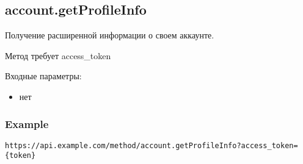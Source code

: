 \subsection{account.getProfileInfo}
Получение расширенной информации о своем аккаунте.

Метод требует access\_token

Входные параметры:
\begin{itemize}
  \item нет
\end{itemize}

\subsubsection{Example}
\begin{Verbatim}[frame=single]
https://api.example.com/method/account.getProfileInfo?access_token={token}
\end{Verbatim}
